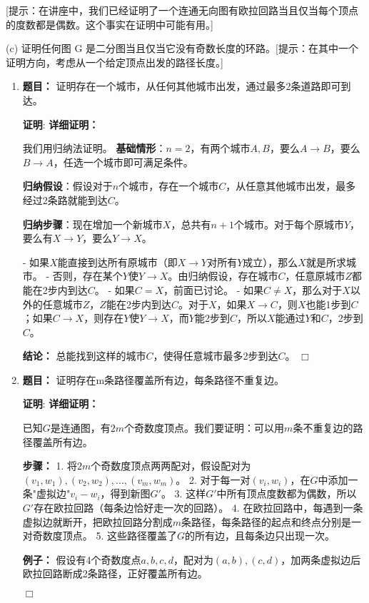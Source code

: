 \documentclass[11pt]{article}
\newenvironment{qparts}{\begin{enumerate}[{(}a{)}]}{\end{enumerate}}
\def\endproofmark{$\Box$}
\newenvironment{proof}{\par{\bf 证明}:}{\endproofmark\smallskip}
\begin{document}
[提示：在讲座中，我们已经证明了一个连通无向图有欧拉回路当且仅当每个顶点的度数都是偶数。这个事实在证明中可能有用。]

(c) 证明任何图 G 是二分图当且仅当它没有奇数长度的环路。[提示：在其中一个证明方向，考虑从一个给定顶点出发的路径长度。]

\begin{qparts}
\item \textbf{题目：} 证明存在一个城市，从任何其他城市出发，通过最多2条道路即可到达。
\begin{proof}
\textbf{详细证明：}

我们用归纳法证明。  
\textbf{基础情形}：$n=2$，有两个城市$A,B$，要么$A\to B$，要么$B\to A$，任选一个城市即可满足条件。

\textbf{归纳假设}：假设对于$n$个城市，存在一个城市$C$，从任意其他城市出发，最多经过2条路就能到达$C$。

\textbf{归纳步骤}：现在增加一个新城市$X$，总共有$n+1$个城市。对于每个原城市$Y$，要么有$X\to Y$，要么$Y\to X$。

- 如果$X$能直接到达所有原城市（即$X\to Y$对所有$Y$成立），那么$X$就是所求城市。
- 否则，存在某个$Y$使$Y\to X$。由归纳假设，存在城市$C$，任意原城市$Z$都能在2步内到达$C$。
  - 如果$C=X$，前面已讨论。
  - 如果$C\neq X$，那么对于$X$以外的任意城市$Z$，$Z$能在2步内到达$C$。对于$X$，如果$X\to C$，则$X$也能1步到$C$；如果$C\to X$，则存在$Y$使$Y\to X$，而$Y$能2步到$C$，所以$X$能通过$Y$和$C$，2步到$C$。

\textbf{结论：} 总能找到这样的城市$C$，使得任意城市最多2步到达$C$。
\end{proof}

\item \textbf{题目：} 证明存在m条路径覆盖所有边，每条路径不重复边。
\begin{proof}
\textbf{详细证明：}

已知$G$是连通图，有$2m$个奇数度顶点。我们要证明：可以用$m$条不重复边的路径覆盖所有边。

\textbf{步骤：}
1. 将$2m$个奇数度顶点两两配对，假设配对为$(v_1,w_1), (v_2,w_2), ..., (v_m,w_m)$。
2. 对于每一对$(v_i,w_i)$，在$G$中添加一条"虚拟边"$v_i-w_i$，得到新图$G'$。
3. 这样$G'$中所有顶点度数都为偶数，所以$G'$存在欧拉回路（每条边恰好走一次的回路）。
4. 在欧拉回路中，每遇到一条虚拟边就断开，把欧拉回路分割成$m$条路径，每条路径的起点和终点分别是一对奇数度顶点。
5. 这些路径覆盖了$G$的所有边，且每条边只出现一次。

\textbf{例子：}  
假设有4个奇数度点$a,b,c,d$，配对为$(a,b),(c,d)$，加两条虚拟边后欧拉回路断成2条路径，正好覆盖所有边。


\end{proof}
\end{qparts}
\end{document}
